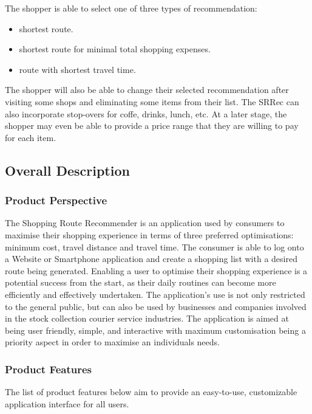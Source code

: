 \documentclass[10pt,twocolumn]{witseiepaper}
\begin{document}
		The shopper is able to select one of three types of recommendation:
		\begin{itemize}
			\item shortest route.
			\item shortest route for minimal total shopping expenses.
			\item route with shortest travel time.
		\end{itemize}
		
		The shopper will also be able to change their selected recommendation after visiting some shops and eliminating some items from their list. The SRRec can also incorporate stop-overs for coffe, drinks, lunch, etc. At a later stage, the shopper may even be able to provide a price range that they are willing to pay for each item.
		
		\subsection{Overall Description}
		
		\subsubsection{Product Perspective}
		
		The Shopping Route Recommender is an application used by consumers to maximise their shopping experience in terms of three preferred optimisations: minimum cost, travel distance and travel time. The consumer is able to log onto a Website or Smartphone application and create a shopping list with a desired route being generated.  Enabling a user to optimise their shopping experience is a potential success from the start, as their daily routines can become more efficiently and effectively undertaken. The application's use is not only restricted to the general public, but can also be used by businesses and companies involved in the stock collection courier service industries. The application is aimed at being user friendly, simple, and interactive with maximum customisation being a priority aspect in order to maximise an individuals needs. 
		
		\subsubsection{Product Features}
		
		The list of product features below aim to provide an easy-to-use, customizable application interface for all users. 
		
\end{document}
